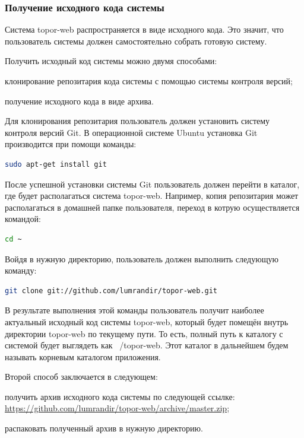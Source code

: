 \subsubsection{Получение исходного кода системы}

Система topor-web распространяется в виде исходного кода. Это значит,
что пользователь системы должен самостоятельно собрать готовую систему.

Получить исходный код системы можно двумя способами:
\begin{list}{}{\leftmargin=1.5cm}
\item клонирование репозитария кода системы с помощью системы
контроля версий;
\item получение исходного кода в виде архива.
\end{list}

Для клонирования репозитария пользователь должен установить
систему контроля версий Git. В операционной системе Ubuntu установка Git
производится при помощи команды:

\begin{lstlisting}[language=bash]
sudo apt-get install git
\end{lstlisting}

После успешной установки системы Git пользователь должен перейти в
каталог, где будет располагаться система topor-web. Например, копия
репозитария может располагаться в домашней папке пользователя, переход в
котрую осуществляется командой:

\begin{lstlisting}[language=bash]
cd ~
\end{lstlisting}

Войдя в нужную директорию, пользователь должен выполнить
следующую команду:

\begin{lstlisting}[language=bash]
git clone git://github.com/lumrandir/topor-web.git
\end{lstlisting}

В результате выполнения этой команды пользователь получит наиболее
актуальный исходный код системы topor-web, который будет помещён внутрь
директории topor-web по текущему пути. То есть, полный путь к каталогу с
системой будет выглядеть как ~/topor-web. Этот каталог в дальнейшем будем
называть корневым каталогом приложения.

Второй способ заключается в следующем:

\begin{list}{}{\leftmargin=1.5cm}
\item получить архив исходного кода системы по следующей ссылке:
\url{https://github.com/lumrandir/topor-web/archive/master.zip};
\item распаковать полученный архив в нужную директорию.
\end{list}

